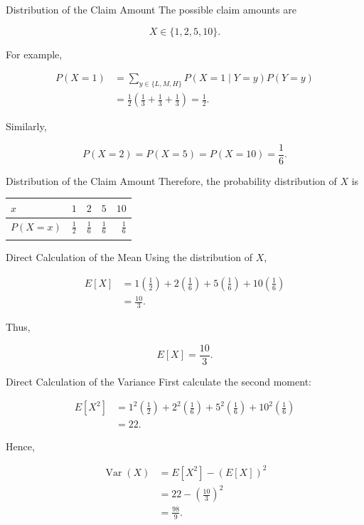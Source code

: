 \documentclass[
  ignorenonframetext,
  aspectratio=169,
]{beamer}
\newcounter{none} %
\begin{document}
\begin{frame}{Distribution of the Claim Amount}
\protect{}\label{distribution-of-the-claim-amount}
The possible claim amounts are

\[
X\in\{1,2,5,10\}.
\]

For example,

\[
\begin{aligned}
P(X=1)
&=\sum_{y\in\{L,M,H\}}P(X=1\mid Y=y)P(Y=y)\\
&=\frac12\left(\frac13+\frac13+\frac13\right)
=\frac12.
\end{aligned}
\]

Similarly,

\[
P(X=2)=P(X=5)=P(X=10)=\frac16.
\]
\end{frame}

\begin{frame}{Distribution of the Claim Amount}
\protect{}\label{distribution-of-the-claim-amount-1}
Therefore, the probability distribution of \(X\) is

{\def\LTcaptype{none} %
\begin{longtable}[]{@{}lrrrr@{}}
\toprule\noalign{}
\(x\) & \(1\) & \(2\) & \(5\) & \(10\) \\
\midrule\noalign{}
\endhead
\(P(X=x)\) & \(\frac12\) & \(\frac16\) & \(\frac16\) & \(\frac16\) \\
\bottomrule\noalign{}
\end{longtable}
}
\end{frame}

\begin{frame}{Direct Calculation of the Mean}
\protect{}\label{direct-calculation-of-the-mean}
Using the distribution of \(X\),

\[
\begin{aligned}
E[X]
&=1\left(\frac12\right)
+2\left(\frac16\right)
+5\left(\frac16\right)
+10\left(\frac16\right)\\
&=\frac{10}{3}.
\end{aligned}
\]

Thus,

\[
\boxed{E[X]=\frac{10}{3}}.
\]
\end{frame}

\begin{frame}{Direct Calculation of the Variance}
\protect{}\label{direct-calculation-of-the-variance}
First calculate the second moment:

\[
\begin{aligned}
E[X^2]
&=1^2\left(\frac12\right)
+2^2\left(\frac16\right)
+5^2\left(\frac16\right)
+10^2\left(\frac16\right)\\
&=22.
\end{aligned}
\]

Hence,

\[
\begin{aligned}
\operatorname{Var}(X)
&=E[X^2]-(E[X])^2\\
&=22-\left(\frac{10}{3}\right)^2\\
&=\frac{98}{9}.
\end{aligned}
\]
\end{frame}
\end{document}
